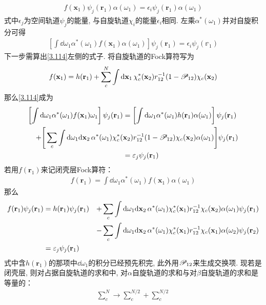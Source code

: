 \begin{align}\label{3.113}
	f(\mathbf{x}_1)\psi_j(\mathbf{r}_1)\alpha(\omega_1) = \epsilon_i\psi_j(\mathbf{r}_1)\alpha(\omega_1)
\end{align}
式中$\epsilon_j$为空间轨道$\psi_j$的能量, 
与自旋轨道$\chi_i$的能量$\epsilon_i$相同. 
左乘$\alpha^*(\omega_1)$并对自旋积分可得
\begin{align}
	\label{3.114}
	\left[ \int\dd\omega_1\alpha^*(\omega_1)f(\mathbf{x}_1)\alpha(\omega_1) \right]\psi_j(\mathbf{r}_1) = \epsilon_i\psi_j(\mathbb{r}_1)
\end{align}
下一步需算出\eqref{3.114}左侧的式子. 
将自旋轨道的Fock算符写为
\begin{align}\label{3.115}
	f(\mathbf{x}_1) = h(\mathbf{r}_1) + \sum_c^N\int\dd{x}_1\,\chi_c^*(\mathbf{x}_2)\twoe(1-\scr{P}_{12})\chi_c(\mathbf{x}_2)
\end{align}
那么\eqref{3.114}成为
\begin{align}
	\left[ \int\dd\omega_1\alpha^*(\omega_1)f(\mathbf{x}_1)\omega_1 \right]\psi_j(\mathbf{r}_1) &= \left[ \int\dd\omega_1\alpha^*(\omega_1)h(\mathbf{r}_1)\alpha(\omega_1) \right]\psi_j(\mathbf{r}_1) \notag\\
	+\Bigg[ \sum_c\int\dd\omega_1\dd{x}_2\,\alpha^*(\omega_1)\chi_c^*(&\mathbf{x}_2)\twoe(1-\scr{P}_{12})\chi_c(\mathbf{x}_2)\alpha(\omega_1) \Bigg]\psi_j(\mathbf{r}_1)  \notag\\
	& = \epsilon_j\psi_j(\mathbf{r}_1)
\end{align}
若用$f(\mathbf{r}_1)$来记闭壳层Fock算符：
\begin{align}
	f(\mathbf{r}_1) = \int\dd\omega_1\alpha^*(\omega_1)f(\mathbf{x}_1)\alpha(\omega_1)
\end{align}
那么
\begin{alignat}{3}
	f(\mathbf{r}_1)\psi_j(\mathbf{r}_1) &= h(\mathbf{r}_1)\psi_j(\mathbf{r}_1) &+ \sum_c\int\dd\omega_1\dd{x}_2\,\alpha^*(\omega_1)\chi_c^*(\mathbf{x}_1)\twoe\chi_c(\mathbf{x}_2)\alpha(\omega_1)\psi_j(\mathbf{r}_1)\notag\\
	&&-\sum_c\int\dd\omega_1\dd{x}_2\,\alpha^*(\omega_1)\chi_c^*(\mathbf{x}_1)\twoe\chi_c(\mathbf{x}_1)\alpha(\omega_2)\psi_j(\mathbf{r}_2)\notag\\
	&=\epsilon_j\psi_j(\mathbf{r}_1)&
\end{alignat}
式中含$h(\mathbf{r}_1)$的那项中$\dd\omega_1$的积分已经预先积完, 
此外用$\mathscr{P}_{12}$来生成交换项. 
现若是闭壳层, 
则对占据自旋轨道的求和中, 
对$\alpha$自旋轨道的求和与对$\beta$自旋轨道的求和是等量的：
\begin{align}
	\sum_c^N\to \sum_c^{N/2} + \sum_c^{N/2}
\end{align}
